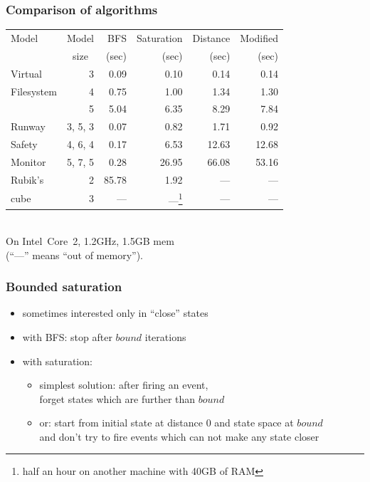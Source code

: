 \documentclass{beamer}
\begin{document}
\begin{frame}
  \frametitle{Comparison of algorithms}

  \vspace{-3.7mm}
  \begin{center}
    \begin{tabular}{|l|r||r|r|r|r|}
      \hline
      {\footnotesize Model} & \multicolumn{1}{|c||}{\footnotesize Model} & {\footnotesize BFS} & {\footnotesize Saturation} & {\footnotesize Distance} & {\footnotesize Modified} \\
      & \multicolumn{1}{|c||}{\footnotesize size}  & {\footnotesize (sec)}  & {\footnotesize (sec)}  & {\footnotesize (sec)} & {\footnotesize (sec)} \\
      \hline
      \hline
      {\footnotesize Virtual} & 3 & 0.09 & 0.10 & 0.14 & 0.14 \\
      {\footnotesize Filesystem} & 4 & 0.75 & 1.00 & 1.34 & 1.30 \\
      & 5 & 5.04 & 6.35 & 8.29 & 7.84 \\
      \hline
      \hline
      {\footnotesize Runway} & 3, 5, 3 & 0.07 & 0.82 & 1.71 & 0.92 \\
      {\footnotesize Safety} & 4, 6, 4 & 0.17 & 6.53 & 12.63 & 12.68 \\
      {\footnotesize Monitor} & 5, 7, 5 & 0.28 & 26.95 & 66.08 & 53.16 \\
      \hline
      \hline
      {\footnotesize Rubik's} & 2 & 85.78 & 1.92 & --- & --- \\
      {\footnotesize cube} & 3 & --- & ---\footnote{half an hour on another machine with 40GB of RAM} & --- & --- \\
      \hline
    \end{tabular}\\
    On Intel~Core~2, 1.2GHz, 1.5GB mem\\(``---'' means ``out of memory'').
  \end{center}

\end{frame}

\begin{frame}
  \frametitle{Bounded saturation}

  \begin{itemize}
  \item sometimes interested only in ``close'' states
  \item with BFS: stop after $bound$ iterations
  \item with saturation:
    \begin{itemize}
    \item simplest solution: after firing an event,\\
      forget states which are further than $bound$
    \item or: start from initial state at distance $0$ and state space at $bound$\\
      and don't try to fire events which can not make any state closer
    \end{itemize}
  \end{itemize}
\end{frame}
\end{document}

